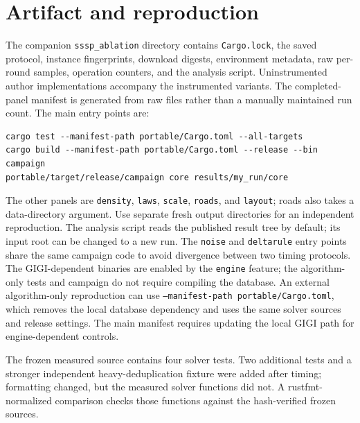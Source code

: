 \documentclass[11pt]{article}
\newcommand{\code}[1]{\texttt{#1}}
\begin{document}
\section{Artifact and reproduction}
The companion \code{sssp\_ablation} directory contains \code{Cargo.lock}, the
saved protocol, instance fingerprints, download digests, environment metadata,
raw per-round samples, operation counters, and the analysis script. Uninstrumented
author implementations accompany the instrumented variants.
The completed-panel manifest is generated from raw files rather than a manually
maintained run count. The main entry points are:
\begin{lstlisting}
cargo test --manifest-path portable/Cargo.toml --all-targets
cargo build --manifest-path portable/Cargo.toml --release --bin campaign
portable/target/release/campaign core results/my_run/core
\end{lstlisting}
The other panels are \code{density}, \code{laws}, \code{scale}, \code{roads},
and \code{layout}; roads also takes a data-directory argument. Use separate fresh
output directories for an independent reproduction. The analysis script reads
the published result tree by default; its input root can be changed to a new run.
The
\code{noise} and \code{deltarule} entry points share the same campaign code to
avoid divergence between two timing protocols. The GIGI-dependent binaries are
enabled by the \code{engine} feature; the algorithm-only tests and campaign do
not require compiling the database. An external algorithm-only reproduction can
use \code{--manifest-path portable/Cargo.toml}, which removes the local database
dependency and uses the same solver sources and release settings. The main
manifest requires updating the local GIGI path for engine-dependent controls.

The frozen measured source contains four solver tests. Two additional tests and
a stronger independent heavy-deduplication fixture were added after timing;
formatting changed, but the measured solver functions did not. A rustfmt-normalized
comparison checks those functions against the hash-verified frozen sources.
\end{document}
